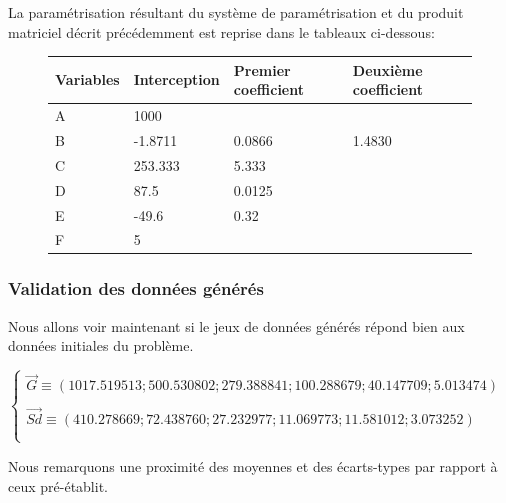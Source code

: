 \documentclass[a4paper]{article}
\begin{document}
\begin{appendices}
La paramétrisation résultant du système de paramétrisation et du produit matriciel décrit précédemment est reprise dans le tableaux ci-dessous:

\begin{figure}[H]
\begin{tabular}{llll}
  \hline
  Variables              & Interception&Premier coefficient& Deuxième coefficient \\
  \hline
A  &1000& &\\
B &-1.8711 &0.0866 &1.4830 \\
C  &253.333 &5.333 & \\
D &87.5&0.0125&\\
E  &-49.6&0.32  & \\
F  &5 & & \\
\hline

\end{tabular}
\end{figure}
\subsubsection{Validation des données générés} 

Nous allons voir maintenant si le jeux de données générés répond bien aux données initiales du problème. 



$\left\lbrace 
\begin{array}{lcl}
\vec{G}\equiv (1017.519513;  500.530802;  279.388841;  100.288679;   40.147709;    5.013474)\\ \\
\vec{Sd}\equiv (410.278669;  72.438760;  27.232977;  11.069773;  11.581012;   3.073252)\\ \\ 
\end{array}\right.$

Nous remarquons une proximité des moyennes et des écarts-types par rapport à ceux pré-établit.


\end{appendices}
\end{document}

